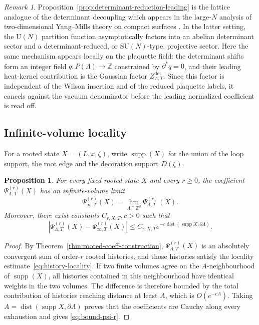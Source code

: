\documentclass[11pt,a4paper,reqno]{amsart}
\newtheorem{proposition}[theorem]{Proposition}
\theoremstyle{definition}
\theoremstyle{remark}
\newtheorem{remark}[theorem]{Remark}
\newcommand\U{{\mathrm U}}
\newcommand\SU{{\mathrm {SU}}}
\newcommand\Z{{\mathbb{Z}}}
\begin{document}
\begin{remark}
Proposition~\ref{prop:determinant-reduction-leading} is the lattice analogue of the determinant decoupling which appears in the large-$N$ analysis of two-dimensional Yang--Mills theory on compact surfaces \cite{Lem22,Lem25}. In the latter setting, the $\U(N)$ partition function asymptotically factors into an abelian determinant sector and a determinant-reduced, or $\SU(N)$-type, projective sector. Here the same mechanism appears locally on the plaquette field: the determinant shifts form an integer field $q:P(\Lambda)\to\Z$ constrained by $\partial^*q=0$, and their leading heat-kernel contribution is the Gaussian factor $Z^{\det}_{\Lambda,T}$. Since this factor is independent of the Wilson insertion and of the reduced plaquette labels, it cancels against the vacuum denominator before the leading normalized coefficient is read off.
\end{remark}

\subsection{Infinite-volume locality}

For a rooted state $X=(L,x,\zeta)$, write $\operatorname{supp}(X)$ for the union of the loop support, the root edge and the decoration support $D(\zeta)$.

\begin{proposition}\label{prop:coefficient-locality}
For every fixed rooted state $X$ and every $r\ge0$, the coefficient $\Psi^{(r)}_{\Lambda,T}(X)$ has an infinite-volume limit
\[
\Psi^{(r)}_{\infty,T}(X)=\lim_{\Lambda\uparrow\Z^d}\Psi^{(r)}_{\Lambda,T}(X).
\]
Moreover, there exist constants $C_{r,X,T},c>0$ such that
\begin{equation}\label{eq:bound-psi-r}
\left|\Psi^{(r)}_{\Lambda,T}(X)-\Psi^{(r)}_{\infty,T}(X)\right|
\le
C_{r,X,T}e^{-c\operatorname{dist}(\operatorname{supp}X,\partial\Lambda)}.
\end{equation}
\end{proposition}

\begin{proof}
By Theorem~\ref{thm:rooted-coeff-construction}, $\Psi^{(r)}_{\Lambda,T}(X)$ is an absolutely convergent sum of order-$r$ rooted histories, and those histories satisfy the locality estimate~\eqref{eq:history-locality}.  If two finite volumes agree on the $A$-neighbourhood of $\operatorname{supp}(X)$, all histories contained in this neighbourhood have identical weights in the two volumes.  The difference is therefore bounded by the total contribution of histories reaching distance at least $A$, which is $O(e^{-cA})$.  Taking $A=\operatorname{dist}(\operatorname{supp}X,\partial\Lambda)$ proves that the coefficients are Cauchy along every exhaustion and gives \eqref{eq:bound-psi-r}.
\end{proof}
\end{document}
